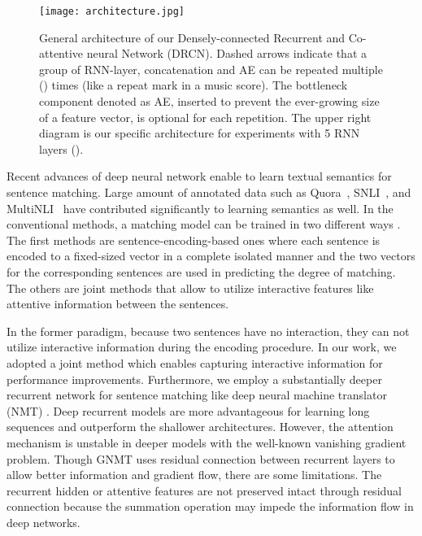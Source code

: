 \documentclass[letterpaper]{article} \usepackage{aaai19}  \usepackage{times}  \usepackage{helvet}  \usepackage{courier}  \usepackage{url}  \usepackage{graphicx}  \frenchspacing  \setlength{\pdfpagewidth}{8.5in}  \setlength{\pdfpageheight}{11in}
\begin{document}
\begin{figure*}
  \centering
  \texttt{[image: architecture.jpg]}
  \caption{General architecture of our Densely-connected Recurrent and Co-attentive neural Network (DRCN). Dashed arrows indicate that a group of RNN-layer, concatenation and AE can be repeated multiple () times (like a repeat mark in a music score). The bottleneck component denoted as AE, inserted to prevent the ever-growing size of a feature vector, is optional for each repetition. The upper right diagram is our specific architecture for experiments with 5 RNN layers ().}  
  \label{fig:arch}
\end{figure*}

Recent advances of deep neural network enable to learn textual semantics for sentence matching. Large amount of annotated data such as Quora~\cite{quora}, SNLI~\cite{snliemnlp2015}, and MultiNLI~\cite{williams2017broad} have contributed significantly to learning semantics as well. In the conventional methods, a matching model can be trained in two different ways \cite{gong2018natural}. The first methods are sentence-encoding-based ones where each sentence is encoded to a fixed-sized vector in a complete isolated manner and the two vectors for the corresponding sentences are used in predicting the degree of matching. The others are joint methods that allow to utilize interactive features like attentive information between the sentences. 

In the former paradigm, because two sentences have no interaction, they can not utilize interactive information during the encoding procedure. In our work, we adopted a joint method which enables capturing interactive information for performance improvements. 
Furthermore, we employ a substantially deeper recurrent network for sentence matching like deep neural machine translator (NMT) \cite{wu2016gnmt}. Deep recurrent models are more advantageous for learning long sequences and outperform the shallower architectures. However, the attention mechanism is unstable in deeper models with the well-known vanishing gradient problem. Though GNMT \cite{wu2016gnmt} uses residual connection between recurrent layers to allow better information and gradient flow, there are some limitations. The recurrent hidden or attentive features are not preserved intact through residual connection because the summation operation may impede the information flow in deep networks. 
\end{document}
